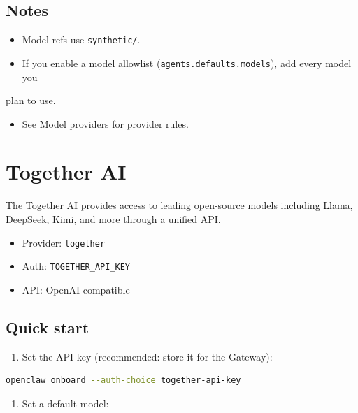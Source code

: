 \subsection{Notes}


\begin{itemize}
  \item Model refs use \texttt{synthetic/}.
  \item If you enable a model allowlist (\texttt{agents.defaults.models}), add every model you
\end{itemize}

plan to use.
\begin{itemize}
  \item See \href{/concepts/model-providers}{Model providers} for provider rules.
\end{itemize}



\clearpage

\section{Together AI}


The \href{https://together.ai}{Together AI} provides access to leading open-source models including Llama, DeepSeek, Kimi, and more through a unified API.

\begin{itemize}
  \item Provider: \texttt{together}
  \item Auth: \texttt{TOGETHER\_API\_KEY}
  \item API: OpenAI-compatible
\end{itemize}


\subsection{Quick start}


\begin{enumerate}
  \item Set the API key (recommended: store it for the Gateway):
\end{enumerate}


\begin{lstlisting}[language=bash]
openclaw onboard --auth-choice together-api-key
\end{lstlisting}


\begin{enumerate}
  \item Set a default model:
\end{enumerate}


